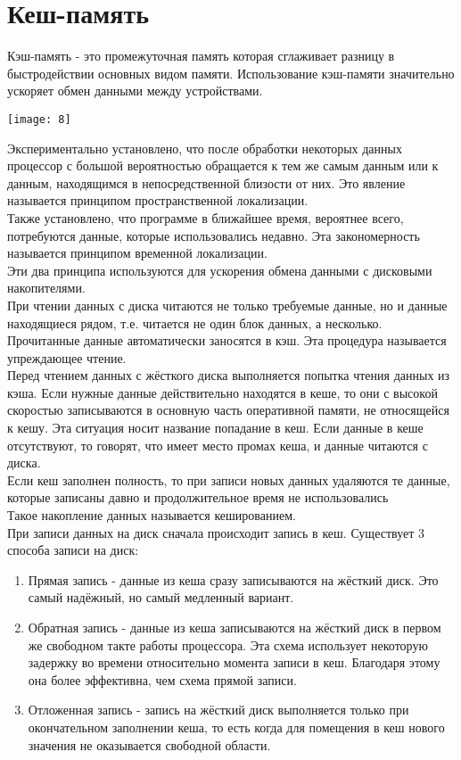 \documentclass[a4paper]{article}
\begin{document}
\section{Кеш-память}
\setcounter{subsection}{0}
Кэш-память - это промежуточная память которая сглаживает разницу в быстродействии основных видом памяти. Использование кэш-памяти значительно ускоряет обмен данными между устройствами.\\
\begin{center}
	\texttt{[image: 8]}
\end{center}
Экспериментально установлено, что после обработки некоторых данных процессор с большой вероятностью обращается к тем же самым данным или к данным, находящимся в непосредственной близости от них. Это явление называется принципом пространственной локализации.\\
Также установлено, что программе в ближайшее время, вероятнее всего, потребуются данные, которые использовались недавно. Эта закономерность называется принципом временной локализации.\\
Эти два принципа используются для ускорения обмена данными с дисковыми накопителями.\\
При чтении данных с диска читаются не только требуемые данные, но и данные находящиеся рядом, т.е. читается не один блок данных, а несколько. Прочитанные данные автоматически заносятся в кэш. Эта процедура называется упреждающее чтение.\\
Перед чтением данных с жёсткого диска выполняется попытка чтения данных из кэша. Если нужные данные действительно находятся в кеше, то они с высокой скоростью записываются в основную часть оперативной памяти, не относящейся к кешу. Эта ситуация носит название попадание в кеш. Если данные в кеше отсутствуют, то говорят, что имеет место промах кеша, и данные читаются с диска.\\
Если кеш заполнен полность, то при записи новых данных удаляются те данные, которые записаны давно и продолжительное время не использовались\\
Такое накопление данных называется кешированием.\\
При записи данных на диск сначала происходит запись в кеш. Существует 3 способа записи на диск:\\
\begin{enumerate}
        
	\item Прямая запись - данные из кеша сразу записываются на жёсткий диск. Это самый надёжный, но самый медленный вариант.\\
\item Обратная запись - данные из кеша записываются на жёсткий диск в первом же свободном такте работы процессора. Эта схема использует некоторую задержку во времени относительно момента записи в кеш. Благодаря этому она более эффективна, чем схема прямой записи.\\
\item Отложенная запись - запись на жёсткий диск выполняется только при окончательном заполнении кеша, то есть когда для помещения в кеш нового значения не оказывается свободной области.\\
\end{enumerate}
\end{document}
